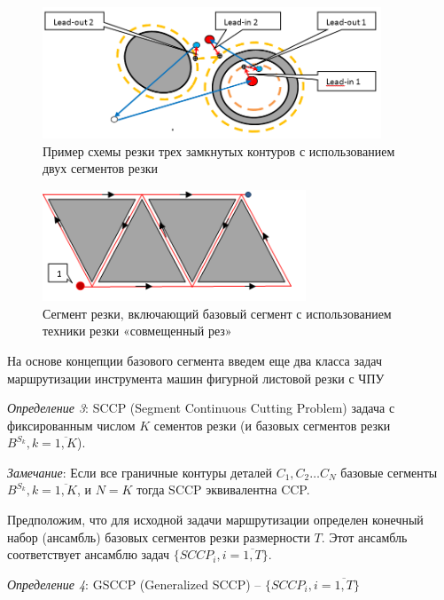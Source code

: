 \documentclass{article}
\begin{document}
\begin{figure}
  \begin{center}
  \includegraphics[width=0.9\textwidth]{cut2-1.png}
  \caption{Пример схемы резки трех замкнутых контуров с использованием двух сегментов резки}
  \label{cut2-1}
  \end{center}
\end{figure}

\begin{figure}
  \begin{center}
  \includegraphics[width=0.7\textwidth]{cut4-3.png}
  \caption{Сегмент резки, включающий базовый сегмент с использованием техники резки «совмещенный рез»}
  \label{cut4-3}
  \end{center}
\end{figure}

На основе концепции базового сегмента введем еще
два класса задач маршрутизации инструмента машин
фигурной листовой резки с ЧПУ

{\it Определение 3}:
SCCP (Segment Continuous Cutting Problem)
задача с фиксированным числом $K$
сементов резки (и базовых сегментов резки
$B^{S_k}, k = \overline{1, K}$).

{\it Замечание}:
Если все граничные контуры деталей
$C_1, C_2 \dots C_N$
базовые сегменты $B^{S_k}, k = \overline{1,K}$,
и $N=K$
тогда SCCP эквивалентна CCP.

Предположим, что для исходной задачи маршрутизации
определен конечный набор (ансамбль)
базовых сегментов резки размерности $T$.
Этот ансамбль соответствует ансамблю задач
$\{SCCP_i, i =\overline{1,T}\}$.

{\it Определение 4}:
GSCCP (Generalized SCCP) –
$\{SCCP_i, i =\overline{1,T}\}$
\end{document}
